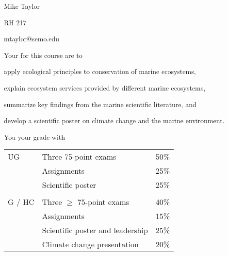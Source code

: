 \documentclass[t]{beamer}
\begin{document}

{
\begin{frame}[t]
\end{frame}
}

{
\begin{frame}[t,plain]
\large
\vspace{5ex}

\hangpara Mike Taylor

\hangpara RH 217

\hangpara mtaylor@semo.edu

\end{frame}
}

\begin{frame}[t]{Your  for this course are to}

	\hangpara apply ecological principles to conservation of marine ecosystems,

	\hangpara explain ecosystem services provided by different marine ecosystems, 

	\hangpara summarize key findings from the marine scientific literature, and
	
	\hangpara develop a scientific poster on climate change and the marine environment.
	
		
\end{frame}


\begin{frame}[t]{You  your grade with}
	\begin{center}\large\begin{tabular}{@{}lll@{}}
	UG		&	Three 75-point exams		& 	50\% \\
				&	Assignments 						& 	25\% \\
			&	Scientific poster 					& 	25\% \\
			&										&	\\
	G / HC	&	Three $\geq$ 75-point exams 		& 	40\% \\
			&	Assignments 						& 	15\% \\
			&	Scientific poster and leadership 	&	25\% \\
			&	Climate change presentation 		&	20\% \\
	\end{tabular}
	\end{center}
\end{frame}
\end{document}
